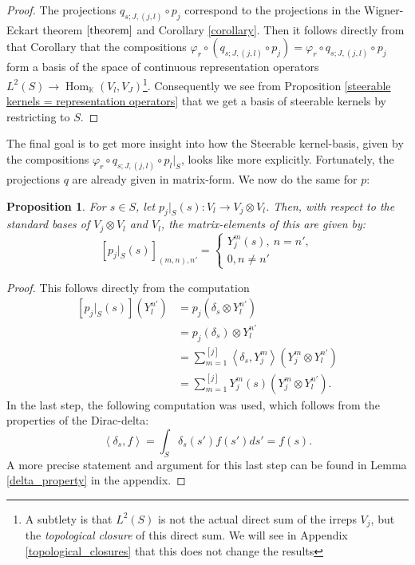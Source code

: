 \documentclass[12pt, a4paper]{article}
\theoremstyle{plain}
\newtheorem{pro}{Proposition}[section]
\theoremstyle{definition}
\theoremstyle{remark}
\newcommand{\K}{\mathds{K}}
\DeclareMathOperator{\Hom}{Hom}
\begin{document}
\begin{proof}
The projections $q_{s; J, (j,l)} \circ p_j$ correspond to the projections in the Wigner-Eckart theorem $\ref{theorem}$ and Corollary \ref{corollary}. Then it follows directly from that Corollary that the compositions $\varphi_r \circ (q_{s; J, (j,l)} \circ p_j) = \varphi_r \circ q_{s; J, (j,l)} \circ p_j$ form a basis of the space of continuous representation operators $L^2(S) \to \Hom_{\K}(V_l, V_J)$\footnote{A subtlety is that $L^2(S)$ is not the actual direct sum of the irreps $V_j$, but the \emph{topological closure} of this direct sum. We will see in Appendix \ref{topological_closures} that this does not change the results}. Consequently we see from Proposition \ref{steerable kernels = representation operators} that we get a basis of steerable kernels by restricting to $S$.
\end{proof}

The final goal is to get more insight into how the Steerable kernel-basis, given by the compositions $\varphi_r \circ q_{s; J, (j,l)} \circ p_l|_S$, looks like more explicitly. Fortunately, the projections $q$ are already given in matrix-form. We now do the same for $p$:

\begin{pro}
For $s \in S$, let $p_j|_S(s): V_l \to V_j \otimes V_l$. Then, with respect to the standard bases of $V_j \otimes V_l$ and $V_l$, the matrix-elements of this are given by:
\begin{equation*}
\left[ p_j|_S(s) \right]_{(m,n),n'} = \begin{cases}
Y_j^{m}(s), \ n = n', \\
0, n \neq n'
\end{cases}
\end{equation*}
\end{pro}

\begin{proof}
This follows directly from the computation
\begin{align*}
\left[ p_j|_S(s)\right] \left(Y_{l}^{n'}\right) & = p_j\left(\delta_s \otimes Y_l^{n'}\right) \\
& = p_j(\delta_s) \otimes Y_l^{n'} \\
& = \sum_{m = 1}^{[j]} \left\langle \delta_s, Y_j^m\right\rangle \left( Y_j^m \otimes Y_l^{n'} \right) \\
& = \sum_{m = 1}^{[j]}Y_j^m(s) \left( Y_j^m \otimes Y_l^{n'}\right).
\end{align*}
In the last step, the following computation was used, which follows from the properties of the Dirac-delta:
\begin{equation*}
\left\langle \delta_s, f \right\rangle = \int_{S} \delta_s(s') f(s') ds' = f(s).
\end{equation*}
A more precise statement and argument for this last step can be found in Lemma \ref{delta_property} in the appendix.
\end{proof}
\end{document}

